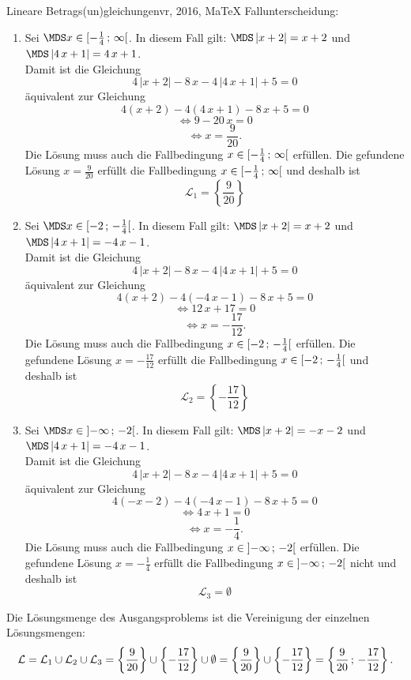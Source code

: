 \begin{MAufgabe}{Lineare Betrags(un)gleichungen}{vr, 2016, MaTeX}
 Fallunterscheidung: 

 \begin{enumerate} 
 \item Sei $ \MDS x\in[ - \frac{1}{4} \, \MIntvlSep \, \infty\MoIr $. 
 In diesem Fall gilt: 
  $ \MDS \left| x + 2\right|=x + 2$ und $ \MDS \left| 4\, x + 1\right|=4\, x + 1$. \\ 
 Damit ist die Gleichung 
 $$ 
4\, \left|x + 2\right| - 8\, x - 4\, \left|4\, x + 1\right| + 5= 0
$$
 \"aquivalent zur Gleichung
 $$ 
4\left(x + 2\right)-4\left( 4\, x + 1\right)- 8\, x+5= 0 
$$  
$$ 
 \Leftrightarrow 9 - 20\, x= 0 
$$  
$$ \Leftrightarrow x = \frac{9}{20} . 
 $$ 
 Die L\"osung muss auch die Fallbedingung $x\in [ - \frac{1}{4} \, ; \, \infty[\mbox{}  $ erf\"ullen. Die gefundene L\"osung $x=\frac{9}{20}$ erf\"ullt die Fallbedingung  $x\in [ - \frac{1}{4} \, ; \, \infty[\mbox{} $ und deshalb ist  $$
 \mathcal{L}_{1}=\left\{\frac{9}{20}\right\}
 $$ 
\item Sei $ \MDS x\in[ -2 \, \MIntvlSep \, - \frac{1}{4}\MoIr $. 
 In diesem Fall gilt: 
  $ \MDS \left| x + 2\right|=x + 2$ und $ \MDS \left| 4\, x + 1\right|= - 4\, x - 1$. \\ 
 Damit ist die Gleichung 
 $$ 
4\, \left|x + 2\right| - 8\, x - 4\, \left|4\, x + 1\right| + 5= 0
$$
 \"aquivalent zur Gleichung
 $$ 
4\left(x + 2\right)-4\left(  - 4\, x - 1\right)- 8\, x+5= 0 
$$  
$$ 
 \Leftrightarrow 12\, x + 17= 0 
$$  
$$ \Leftrightarrow x = - \frac{17}{12} . 
 $$ 
 Die L\"osung muss auch die Fallbedingung $x\in [ -2 \, ; \, - \frac{1}{4}[\mbox{}  $ erf\"ullen. Die gefundene L\"osung $x=- \frac{17}{12}$ erf\"ullt die Fallbedingung  $x\in [ -2 \, ; \, - \frac{1}{4}[\mbox{} $ und deshalb ist  $$
 \mathcal{L}_{2}=\left\{- \frac{17}{12}\right\}
 $$ 
\item Sei $ \MDS x\in\MoIl  -\infty \, \MIntvlSep \, -2\MoIr $. 
 In diesem Fall gilt: 
  $ \MDS \left| x + 2\right|= - x - 2$ und $ \MDS \left| 4\, x + 1\right|= - 4\, x - 1$. \\ 
 Damit ist die Gleichung 
 $$ 
4\, \left|x + 2\right| - 8\, x - 4\, \left|4\, x + 1\right| + 5= 0
$$
 \"aquivalent zur Gleichung
 $$ 
4\left( - x - 2\right)-4\left(  - 4\, x - 1\right)- 8\, x+5= 0 
$$  
$$ 
 \Leftrightarrow 4\, x + 1= 0 
$$  
$$ \Leftrightarrow x = - \frac{1}{4} . 
 $$ 
 Die L\"osung muss auch die Fallbedingung $x\in \mbox{}]\mathopen{}  -\infty \, ; \, -2[\mbox{}  $ erf\"ullen. Die gefundene L\"osung $x=- \frac{1}{4}$ erf\"ullt die Fallbedingung  $x\in \mbox{}]\mathopen{}  -\infty \, ; \, -2[\mbox{} $ nicht und deshalb ist  $$
 \mathcal{L}_{3}=\emptyset 
 $$ 
 \end{enumerate} 
  Die L\"osungsmenge des Ausgangsproblems ist die Vereinigung der einzelnen L\"osungsmengen: 
$$ \mathcal{L} = \mathcal{L}_{1} \cup \mathcal{L}_{2} \cup \mathcal{L}_{3} 
 = \left\{\frac{9}{20}\right\}\cup \left\{- \frac{17}{12}\right\}\cup \emptyset 
  =\left\{\frac{9}{20}\right\}\cup\left\{- \frac{17}{12}\right\} 
  = \left\{\frac{9}{20}\, ; \,- \frac{17}{12}\right\} 
 . $$ 
 

\end{MAufgabe}

